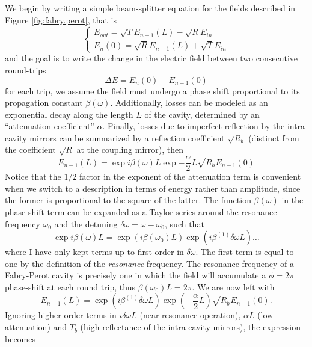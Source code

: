 We begin by writing a simple beam-splitter equation for the fields described in Figure \ref{fig:fabry.perot}, that is
%
\begin{equation}
    \begin{cases}
    E_{out}=\sqrt{T}E_{n-1}(L)-\sqrt{R}E_{in}\\[0.5cm]
    E_{n}(0)=\sqrt{R}E_{n-1}(L)+\sqrt{T}E_{in}
    \end{cases}
    \label{eq:beam splitter}
\end{equation}
%
and the goal is to write the change in the electric field between two consecutive round-trips
%
\begin{equation}
    \Delta E = E_n(0)-E_{n-1}(0)
\end{equation}
for each trip, we assume the field must undergo a phase shift proportional to its propagation constant $\beta(\omega)$. Additionally, losses can be modeled as an exponential decay along the length $L$ of the cavity, determined by an ``attenuation coefficient'' $\alpha$. Finally, losses due to imperfect reflection by the intra-cavity mirrors can be summarized by a reflection coefficient $\sqrt{R_b}$ (distinct from the coefficient $\sqrt{R}$ at the coupling mirror), then
%
\begin{equation}
    E_{n-1}(L)=\exp{i\beta(\omega)L}\exp{-\frac{\alpha}{2}L}\sqrt{R_b}E_{n-1}(0)
\end{equation}
Notice that the $1/2$ factor in the exponent of the attenuation term is convenient when we switch to a description in terms of energy rather than amplitude, since the former is proportional to the square of the latter. The function $\beta(\omega)$ in the phase shift term can be expanded as a Taylor series around the resonance frequency $\omega_0$ and the detuning $\delta\omega=\omega-\omega_0$, such that
\begin{equation}
    \exp{i\beta(\omega)L}=\exp(i\beta(\omega_0)L)\exp(i\beta^{(1)}\delta\omega L)\dots
\end{equation}
%
where I have only kept terms up to first order in $\delta\omega$. The first term is equal to one by the definition of the \textit{resonance} frequency. The resonance frequency of a Fabry-Perot cavity is precisely one in which the field will accumulate a $\phi=2\pi$ phase-shift at each round trip, thus $\beta(\omega_0)L=2\pi$. We are now left with
%
\begin{equation}
    E_{n-1}(L)=\exp(i\beta^{(1)}\delta\omega L)\exp(-\frac{\alpha}{2}L)\sqrt{R_b}E_{n-1}(0).
\end{equation}
Ignoring higher order terms in $i\delta\omega L$ (near-resonance operation), $\alpha L$ (low attenuation) and $T_b$ (high reflectance of the intra-cavity mirrors), the expression becomes
